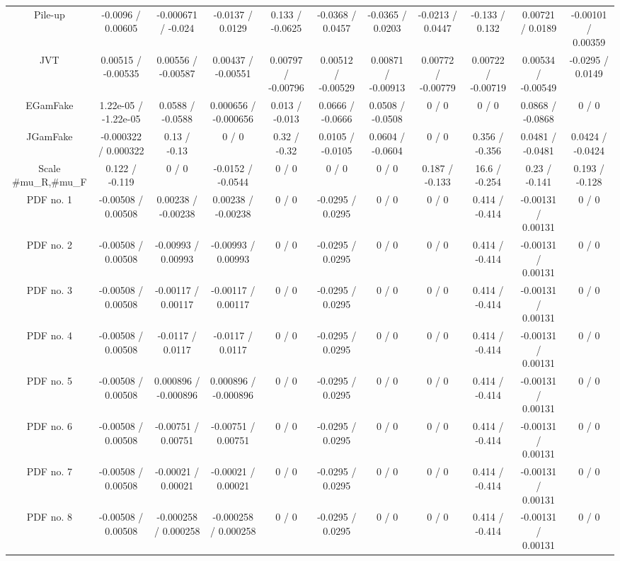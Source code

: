 \begin{table}[htbp]
\begin{center}
\begin{tabular}{|c|c|c|c|c|c|c|c|c|c|c|}
  Pile-up & -0.0096 / 0.00605 & -0.000671 / -0.024 & -0.0137 / 0.0129 & 0.133 / -0.0625 & -0.0368 / 0.0457 & -0.0365 / 0.0203 & -0.0213 / 0.0447 & -0.133 / 0.132 & 0.00721 / 0.0189 & -0.00101 / 0.00359 \\ 
  JVT & 0.00515 / -0.00535 & 0.00556 / -0.00587 & 0.00437 / -0.00551 & 0.00797 / -0.00796 & 0.00512 / -0.00529 & 0.00871 / -0.00913 & 0.00772 / -0.00779 & 0.00722 / -0.00719 & 0.00534 / -0.00549 & -0.0295 / 0.0149 \\ 
  EGamFake & 1.22e-05 / -1.22e-05 & 0.0588 / -0.0588 & 0.000656 / -0.000656 & 0.013 / -0.013 & 0.0666 / -0.0666 & 0.0508 / -0.0508 & 0 / 0 & 0 / 0 & 0.0868 / -0.0868 & 0 / 0 \\ 
  JGamFake & -0.000322 / 0.000322 & 0.13 / -0.13 & 0 / 0 & 0.32 / -0.32 & 0.0105 / -0.0105 & 0.0604 / -0.0604 & 0 / 0 & 0.356 / -0.356 & 0.0481 / -0.0481 & 0.0424 / -0.0424 \\ 
  Scale #mu_{R},#mu_{F} & 0.122 / -0.119 & 0 / 0 & -0.0152 / -0.0544 & 0 / 0 & 0 / 0 & 0 / 0 & 0.187 / -0.133 & 16.6 / -0.254 & 0.23 / -0.141 & 0.193 / -0.128 \\ 
  PDF no. 1 & -0.00508 / 0.00508 & 0.00238 / -0.00238 & 0.00238 / -0.00238 & 0 / 0 & -0.0295 / 0.0295 & 0 / 0 & 0 / 0 & 0.414 / -0.414 & -0.00131 / 0.00131 & 0 / 0 \\ 
  PDF no. 2 & -0.00508 / 0.00508 & -0.00993 / 0.00993 & -0.00993 / 0.00993 & 0 / 0 & -0.0295 / 0.0295 & 0 / 0 & 0 / 0 & 0.414 / -0.414 & -0.00131 / 0.00131 & 0 / 0 \\ 
  PDF no. 3 & -0.00508 / 0.00508 & -0.00117 / 0.00117 & -0.00117 / 0.00117 & 0 / 0 & -0.0295 / 0.0295 & 0 / 0 & 0 / 0 & 0.414 / -0.414 & -0.00131 / 0.00131 & 0 / 0 \\ 
  PDF no. 4 & -0.00508 / 0.00508 & -0.0117 / 0.0117 & -0.0117 / 0.0117 & 0 / 0 & -0.0295 / 0.0295 & 0 / 0 & 0 / 0 & 0.414 / -0.414 & -0.00131 / 0.00131 & 0 / 0 \\ 
  PDF no. 5 & -0.00508 / 0.00508 & 0.000896 / -0.000896 & 0.000896 / -0.000896 & 0 / 0 & -0.0295 / 0.0295 & 0 / 0 & 0 / 0 & 0.414 / -0.414 & -0.00131 / 0.00131 & 0 / 0 \\ 
  PDF no. 6 & -0.00508 / 0.00508 & -0.00751 / 0.00751 & -0.00751 / 0.00751 & 0 / 0 & -0.0295 / 0.0295 & 0 / 0 & 0 / 0 & 0.414 / -0.414 & -0.00131 / 0.00131 & 0 / 0 \\ 
  PDF no. 7 & -0.00508 / 0.00508 & -0.00021 / 0.00021 & -0.00021 / 0.00021 & 0 / 0 & -0.0295 / 0.0295 & 0 / 0 & 0 / 0 & 0.414 / -0.414 & -0.00131 / 0.00131 & 0 / 0 \\ 
  PDF no. 8 & -0.00508 / 0.00508 & -0.000258 / 0.000258 & -0.000258 / 0.000258 & 0 / 0 & -0.0295 / 0.0295 & 0 / 0 & 0 / 0 & 0.414 / -0.414 & -0.00131 / 0.00131 & 0 / 0 \\ 

\end{tabular}
\end{center}
\end{table}
